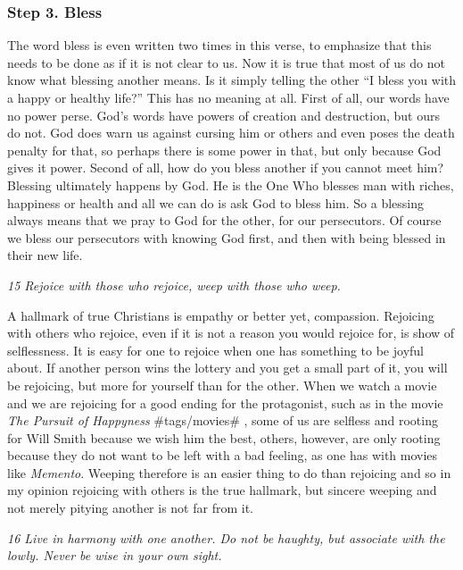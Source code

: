 \subsubsection{Step 3. Bless} The word bless is even written two times in this
verse, to emphasize that this needs to be done as if it is not clear to
us. Now it is true that most of us do not know what blessing another
means. Is it simply telling the other ``I bless you with a happy or
healthy life?'' This has no meaning at all. First of all, our words have
no power perse. God's words have powers of creation and destruction, but
ours do not. God does warn us against cursing him or others and even
poses the death penalty for that, so perhaps there is some power in
that, but only because God gives it power. Second of all, how do you
bless another if you cannot meet him? Blessing ultimately happens by
God. He is the One Who blesses man with riches, happiness or health and
all we can do is ask God to bless him. So a blessing always means that
we pray to God for the other, for our persecutors. Of course we bless
our persecutors with knowing God first, and then with being blessed in
their new life.

\emph{15 Rejoice with those who rejoice, weep with those who weep.}

A hallmark of true Christians is empathy or better yet, compassion.
Rejoicing with others who rejoice, even if it is not a reason you would
rejoice for, is show of selflessness. It is easy for one to rejoice when
one has something to be joyful about. If another person wins the lottery
and you get a small part of it, you will be rejoicing, but more for
yourself than for the other. When we watch a movie and we are rejoicing
for a good ending for the protagonist, such as in the movie \emph{The
Pursuit of Happyness} \#tags/movies\# , some of us are selfless and
rooting for Will Smith because we wish him the best, others, however,
are only rooting because they do not want to be left with a bad feeling,
as one has with movies like \emph{Memento}. Weeping therefore is an
easier thing to do than rejoicing and so in my opinion rejoicing with
others is the true hallmark, but sincere weeping and not merely pitying
another is not far from it.

\emph{16 Live in harmony with one another. Do not be haughty, but
associate with the lowly. Never be wise in your own sight.}

